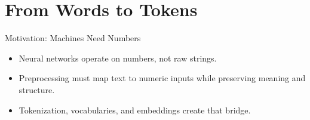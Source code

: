 \documentclass[aspectratio=169]{beamer}
\begin{document}
\section{From Words to Tokens}

\begin{frame}{Motivation: Machines Need Numbers}
  \begin{itemize}
    \item Neural networks operate on numbers, not raw strings.
    \item Preprocessing must map text to numeric inputs while preserving meaning and structure.
    \item Tokenization, vocabularies, and embeddings create that bridge.
  \end{itemize}
\end{frame}

\end{document}
